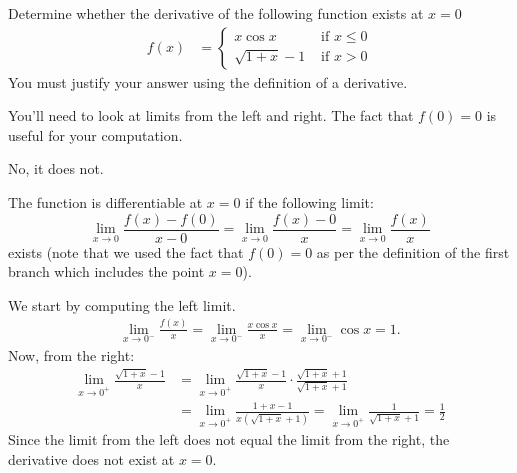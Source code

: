 \begin{question}[2015Q]
 Determine whether the derivative of the following function exists at
$x=0$
\begin{align*}
f(x) &=\begin{cases}
  x \cos x & \text{ if }  x\le 0\\
  \sqrt{1+x}-1 & \text{ if } x> 0
\end{cases}
\end{align*}
You must justify your answer using the definition of a derivative.
\end{question}
\begin{hint} You'll need to look at limits from the left and right. The fact that $f(0)=0$ is useful for your computation.
\end{hint}
\begin{answer} No, it does not.
\end{answer}
\begin{solution}
The function is differentiable at $x=0$ if the following limit:
$$\lim_{x\to 0}\frac{f(x)-f(0)}{x-0} = \lim_{x\to 0}\frac{f(x)-0}{x}=\lim_{x\to
0} \frac{f(x)}{x}$$
exists (note that we used the fact that $f(0)=0$ as per the definition of the
first branch which includes the point $x=0$).

We start by computing the left limit.
\begin{align*}
\lim_{x\to 0^-}\frac{f(x)}{x}=\lim_{x\to 0^-} \frac{x\cos x}{x}
=\lim_{x\to 0^-} \cos x = 1.
\end{align*}
Now, from the right:
\begin{align*}
\lim_{x\to 0^+}\frac{\sqrt{1+x}-1}{x}
&= \lim_{x\to 0^+}\frac{\sqrt{1+x}-1}{x} \cdot \frac{\sqrt{1+x}+1}{\sqrt{1+x}+1} \\
&= \lim_{x\to 0^+} \frac{1+x-1}{x(\sqrt{1+x}+1)}
= \lim_{x\to 0^+} \frac{1}{\sqrt{1+x}+1} = \frac{1}{2}
\end{align*}
Since the limit from the left does not equal the limit from the right, the derivative
does
not exist at $x=0$.
\end{solution}


